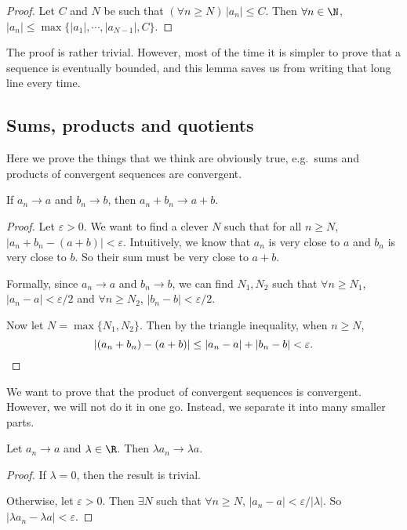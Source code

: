 \documentclass[a4paper]{article}
\begin{document}
\begin{proof}
  Let $C$ and $N$ be such that $(\forall n\geq N)\,|a_n| \leq C$. Then $\forall n \in \N$, $|a_n| \leq \max\{|a_1|, \cdots, |a_{N - 1}|, C\}$.
\end{proof}

The proof is rather trivial. However, most of the time it is simpler to prove that a sequence is eventually bounded, and this lemma saves us from writing that long line every time.

\subsection{Sums, products and quotients}
Here we prove the things that we think are obviously true, e.g.\ sums and products of convergent sequences are convergent.

\begin{lemma}
  If $a_n \to a$ and $b_n \to b$, then $a_n + b_n \to a + b$.
\end{lemma}

\begin{proof}
  Let $\varepsilon > 0$. We want to find a clever $N$ such that for all $n \geq N$, $|a_n + b_n - (a+b)| < \varepsilon$. Intuitively, we know that $a_n$ is very close to $a$ and $b_n$ is very close to $b$. So their sum must be very close to $a + b$.

  Formally, since $a_n\to a$ and $b_n \to b$, we can find $N_1, N_2$ such that $\forall n \geq N_1$, $|a_n - a| < \varepsilon/2$ and $\forall n \geq N_2$, $|b_n - b| < \varepsilon/2$.

  Now let $N = \max\{N_1, N_2\}$. Then by the triangle inequality, when $n \geq N$,
  \[
    |(a_n + b_n) - (a + b)| \leq |a_n - a| + |b_n - b| < \varepsilon. \qedhere
  \]
\end{proof}

We want to prove that the product of convergent sequences is convergent. However, we will not do it in one go. Instead, we separate it into many smaller parts.
\begin{lemma}
  Let $a_n \to a$ and $\lambda \in \R$. Then $\lambda a_n \to \lambda a$.
\end{lemma}

\begin{proof}
  If $\lambda = 0$, then the result is trivial.

  Otherwise, let $\varepsilon > 0$. Then $\exists N$ such that $\forall n \geq N$, $|a_n - a| < \varepsilon/|\lambda|$. So $|\lambda a_n - \lambda a| < \varepsilon$.
\end{proof}
\end{document}
